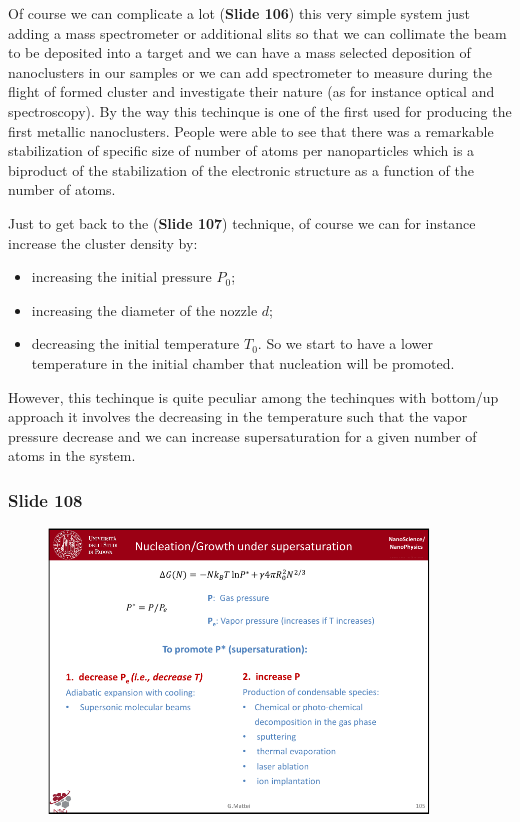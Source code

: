 \documentclass[../main/main.tex]{subfiles}
\begin{document}
 Of course we can complicate a lot
(\textbf{Slide 106}) this very simple system just adding a mass spectrometer or additional slits so that we can collimate the beam to be deposited into a target and we can have a mass selected deposition of nanoclusters in our samples or we can add spectrometer to measure during the flight of formed cluster and investigate their nature (as for instance optical and spectroscopy). By the way this techinque is one of the first used for producing the first metallic nanoclusters. People were able to see that there was a remarkable stabilization of specific size of number of atoms per nanoparticles which is a biproduct of the stabilization of the electronic structure as a function of the number of atoms.


Just to get back to the (\textbf{Slide 107}) technique, of course we can for instance increase the cluster density by:
\begin{itemize}
\item  increasing the initial pressure \( P_0 \);
\item  increasing the diameter of the nozzle \( d \);
\item decreasing the initial temperature \( T_0 \). So we start to have a lower temperature in the initial chamber that nucleation will be promoted.

\end{itemize}


However, this techinque is quite peculiar among the techinques with bottom/up approach it involves the decreasing in the temperature such that the vapor pressure decrease and we can increase supersaturation for a given number of atoms in the system.

\newpage

\subsubsection{Slide 108}

\begin{figure}[h!]
\centering
\includegraphics[page=4,width=0.9\textwidth]{../lessons/pdf_file/7_lesson.pdf}
\end{figure}
\end{document}
